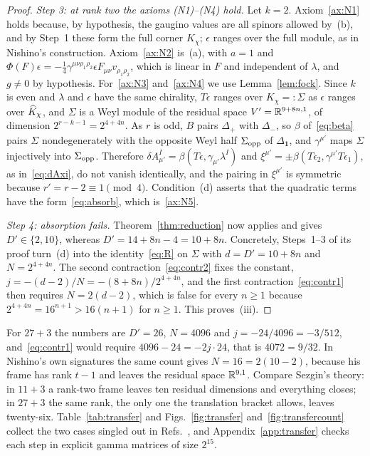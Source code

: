 \begin{proof}
\emph{Step 3: at rank two the axioms (N1)--(N4) hold.} Let $k=2$. Axiom~\ref{ax:N1} holds because, by hypothesis, the gaugino values are all spinors allowed by~(b), and by Step~1 these form the full corner $K_\chi$; $\epsilon$ ranges over the full module, as in Nishino's construction. Axiom~\ref{ax:N2} is~(a), with $a=1$ and $\Phi(F)\epsilon=-\frac14\gamma^{\mu\nu\rho_1\rho_2}\epsilon F_{\mu\nu}v_{\rho_1\rho_2}$, which is linear in $F$ and independent of $\lambda$, and $g\ne0$ by hypothesis. For~\ref{ax:N3} and~\ref{ax:N4} we use Lemma~\ref{lem:fock}. Since $k$ is even and $\lambda$ and $\epsilon$ have the same chirality, $T\epsilon$ ranges over $K_\chi=:\Sigma$ as $\epsilon$ ranges over $\widehat{K}_\chi$, and $\Sigma$ is a Weyl module of the residual space $V'=\mathbb{R}^{9+8n,1}$, of dimension $2^{r-k-1}=2^{4+4n}$. As $r$ is odd, $B$ pairs $\Delta_+$ with $\Delta_-$, so $\beta$ of~\eqref{eq:beta} pairs $\Sigma$ nondegenerately with the opposite Weyl half $\Sigma_{\rm opp}$ of $\Delta_{\mathbf 1}$, and $\gamma^{\mu'}$ maps $\Sigma$ injectively into $\Sigma_{\rm opp}$. Therefore $\delta A^I_{\mu'}=\beta(T\epsilon,\gamma_{\mu'}\lambda^I)$ and $\xi^{\mu'}=\pm\beta(T\epsilon_2,\gamma^{\mu'}T\epsilon_1)$, as in~\eqref{eq:dAxi}, do not vanish identically, and the pairing in $\xi^{\mu'}$ is symmetric because $r'=r-2\equiv1\pmod4$. Condition~(d) asserts that the quadratic terms have the form~\eqref{eq:absorb}, which is~\ref{ax:N5}.

\emph{Step 4: absorption fails.} Theorem~\ref{thm:reduction} now applies and gives $D'\in\{2,10\}$, whereas $D'=14+8n-4=10+8n$. Concretely, Steps~1--3 of its proof turn~(d) into the identity~\eqref{eq:R} on $\Sigma$ with $d=D'=10+8n$ and $N=2^{4+4n}$. The second contraction~\eqref{eq:contr2} fixes the constant, $j=-(d-2)/N=-(8+8n)/2^{4+4n}$, and the first contraction~\eqref{eq:contr1} then requires $N=2(d-2)$, which is false for every $n\ge1$ because $2^{4+4n}=16^{n+1}>16(n+1)$ for $n\ge1$. This proves~(iii).
\end{proof}

For $27+3$ the numbers are $D'=26$, $N=4096$ and $j=-24/4096=-3/512$, and~\eqref{eq:contr1} would require $4096-24=-2j\cdot24$, that is $4072=9/32$. In Nishino's own signatures the same count gives $N=16=2(10-2)$, because his frame has rank $t-1$ and leaves the residual space $\mathbb{R}^{9,1}$. Compare Sezgin's theory: in $11+3$ a rank-two frame leaves ten residual dimensions and everything closes; in $27+3$ the same rank, the only one the translation bracket allows, leaves twenty-six. Table~\ref{tab:transfer} and Figs.~\ref{fig:transfer} and~\ref{fig:transfercount} collect the two cases singled out in Refs.~\cite{RiosMarraniChester2019,RiosMarraniChester2020}, and Appendix~\ref{app:transfer} checks each step in explicit gamma matrices of size $2^{15}$.

